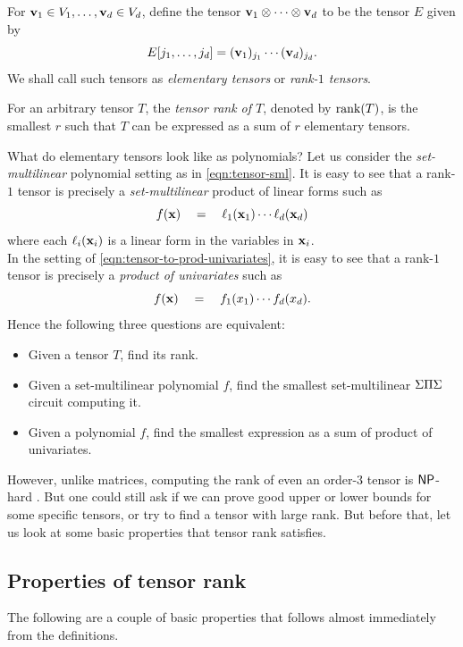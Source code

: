 \begin{definition}
  For $\mathbf{v}_1\in V_1, \ldots, \mathbf{v}_d \in V_d$, define the tensor $\mathbf{v}_1 \otimes \cdots \otimes \mathbf{v}_d$ to be the tensor $E$ given by
\[
E[j_1,\ldots, j_d] = (\mathbf{v}_1)_{j_1} \cdots (\mathbf{v}_d)_{j_d}.
\]
We shall call such tensors as \emph{elementary tensors} or \emph{rank-$1$ tensors}. 

For an arbitrary tensor $T$, the \emph{tensor rank of $T$}, denoted by $\operatorname{rank}(T)$, is the smallest $r$ such that $T$ can be expressed as a sum of $r$ elementary tensors. 
\end{definition}

\noindent 
What do elementary tensors look like as polynomials?
Let us consider the \emph{set-multilinear} polynomial setting as in \eqref{eqn:tensor-sml}.
It is easy to see that a rank-$1$ tensor is precisely a \emph{set-multilinear} product of linear forms such as
\[
f(\mathbf{x}) \quad = \quad \ell_1(\mathbf{x}_1) \cdots \ell_d(\mathbf{x}_d)
\]
where each $\ell_i(\mathbf{x}_i)$ is a linear form in the variables in $\mathbf{x}_i$. \\

In the setting of \eqref{eqn:tensor-to-prod-univariates}, it is easy to see that a rank-$1$ tensor is precisely a \emph{product of univariates} such as
\[
f(\mathbf{x}) \quad = \quad f_1(x_1)\cdots f_d(x_d).
\]
\noindent
Hence the following three questions are equivalent:
\begin{itemize}
\setlength\itemsep{0em}
\item Given a tensor $T$, find its rank. 
\item Given a set-multilinear polynomial $f$, find the smallest set-multilinear $\Sigma\Pi\Sigma$ circuit computing it. 
\item Given a polynomial $f$, find the smallest expression as a sum of product of univariates.
\end{itemize}

However, unlike matrices, computing the rank of even an order-$3$ tensor is $\mathsf{NP}$-hard \cite{h90}.
But one could still ask if we can prove good upper or lower bounds for some specific tensors, or try to find a tensor with large rank.
But before that, let us look at some basic properties that tensor rank satisfies.

\subsection*{Properties of  tensor rank}

The following are a couple of basic properties that follows almost immediately from the definitions.

